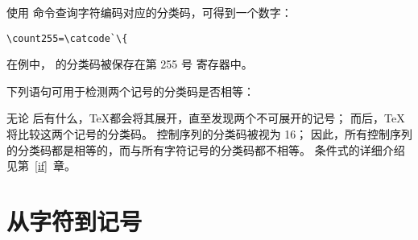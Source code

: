 \documentclass{book}
\begin{document}
使用  命令查询字符编码对应的分类码，可得到一个数字：
\begin{verbatim}
\count255=\catcode`\{
\end{verbatim}
在例中，\n{\{} 的分类码被保存在第 255 号  寄存器中。

下列语句可用于检测两个记号的分类码是否相等：
\begin{disp}\end{disp}
无论  后有什么，\TeX 都会将其展开，直至发现两个不可展开的记号；
而后，\TeX 将比较这两个记号的分类码。
控制序列的分类码被视为 16；
因此，所有控制序列的分类码都是相等的，而与所有字符记号的分类码都不相等。
条件式的详细介绍见第~\ref{if}~章。

\section{从字符到记号}
\end{document}
